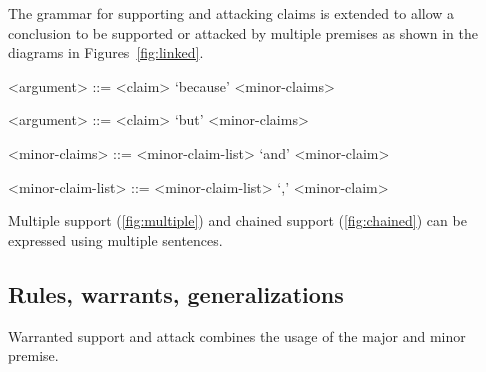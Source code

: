 The grammar for supporting and attacking claims is extended to allow a conclusion to be supported or attacked by multiple premises as shown in the diagrams in Figures~\ref{fig:linked}.

\begin{grammar}
<argument> ::= <claim> `because' <minor-claims> %

<argument> ::= <claim> `but' <minor-claims> %

<minor-claims> ::= <minor-claim-list> `and' <minor-claim>

<minor-claim-list> ::= <minor-claim-list> `,' <minor-claim>
\end{grammar}

\noindent Multiple support (\autoref{fig:multiple}) and chained support (\autoref{fig:chained}) can be expressed using multiple sentences.

\subsection{Rules, warrants, generalizations}
Warranted support and attack combines the usage of the major and minor premise.


